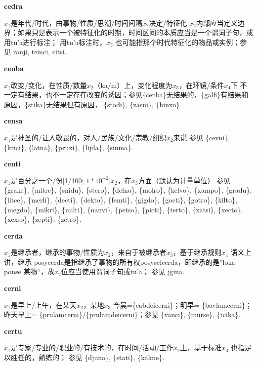 \documentclass[notitlepage,twocolumn,a4paper,10pt]{book}
\begin{document}
{\sffamily\bfseries cedra} $x_1$是年代\slash{}时代，由事物\slash{}性质\slash{}思潮\slash{}时间间隔$x_2$决定\slash{}特征化 \textemdash{} $x_2$内部应当定义边界；如果只是表示一个被特征化的时期，时间区间的本质应当是一个谓词子句，或用tu'a进行标注； 用tu'a标注时，$x_2$ 也可能指那个时代特征化的物品或实例；参见 {ranji}, {temci}, {citsi}.

{\sffamily\bfseries cenba}\enspace {\ttfamily\bfseries[    cne]}  $x_1$改变\slash{}变化，在性质\slash{}数量$x_2$（ka\slash{}ni）上，变化程度为$x_3$，在环镜\slash{}条件$x_4$下 \textemdash{} 不一定有结果，也不一定存在改变的诱因；参见\{cenba\}无结果的，\{galfi\}有结果和原因，\{stika\}无结果但有原因， \{stodi\}, \{zasni\}, \{binxo\}

{\sffamily\bfseries censa}\enspace {\ttfamily\bfseries[ces]}  $x_1$是神圣的\slash{}让人敬畏的，对人\slash{}民族\slash{}文化\slash{}宗教\slash{}组织$x_2$来说 \textemdash{} 参见 \{cevni\}, \{krici\}, \{latna\}, \{pruxi\}, \{lijda\}, \{sinma\}.

{\sffamily\bfseries centi}\enspace {\ttfamily\bfseries[cen]}  $x_1$是百分之一个\slash{}份[1\slash{}100; $1*10^{-2}$]$x_2$，在$x_3$方面（默认为计量单位） \textemdash{} 参见 \{grake\}, \{mitre\}, \{snidu\}, \{stero\}, \{delno\}, \{molro\}, \{kelvo\}, \{xampo\}, \{gradu\}, \{litce\}, \{merli\}, \{decti\}, \{dekto\}, \{femti\}, \{gigdo\}, \{gocti\}, \{gotro\}, \{kilto\}, \{megdo\}, \{mikri\}, \{milti\}, \{nanvi\}, \{petso\}, \{picti\}, \{terto\}, \{xatsi\}, \{xecto\}, \{xexso\}, \{zepti\}, \{zetro\}.

{\sffamily\bfseries cerda}\enspace {\ttfamily\bfseries[ced]}  $x_1$是继承者，继承的事物\slash{}性质为$x_2$，来自于被继承者$x_3$，基于继承规则$x_4$ \textemdash{} 语义上讲，继承 {posycerda}是指继承了事物的所有权{posyselcerda}，即继承的是”loka ponse 某物“，故$x_2$位应当使用谓词子句或tu'a； 参见 {jgina}.

{\sffamily\bfseries cerni}\enspace {\ttfamily\bfseries[cer]}  $x_1$是早上\slash{}上午，在某天$x_2$，某地$x_3$ \textemdash{} 今晨=\{cabdeicerni\}；明早= \{bavlamcerni\}；昨天早上= \{prulamcerni\}\slash{}\{prulamdeicerni\}；参见 \{vanci\}, \{murse\}, \{tcika\}.

{\sffamily\bfseries certu}\enspace {\ttfamily\bfseries[    cre]}  $x_1$是专家\slash{}专业的\slash{}职业的\slash{}有技术的，在时间\slash{}活动\slash{}工作$x_2$上，基于标准$x_3$ \textemdash{} 也指足以胜任的，熟练的； 参见 \{djuno\}, \{stati\}, \{kakne\}.
\end{document}
